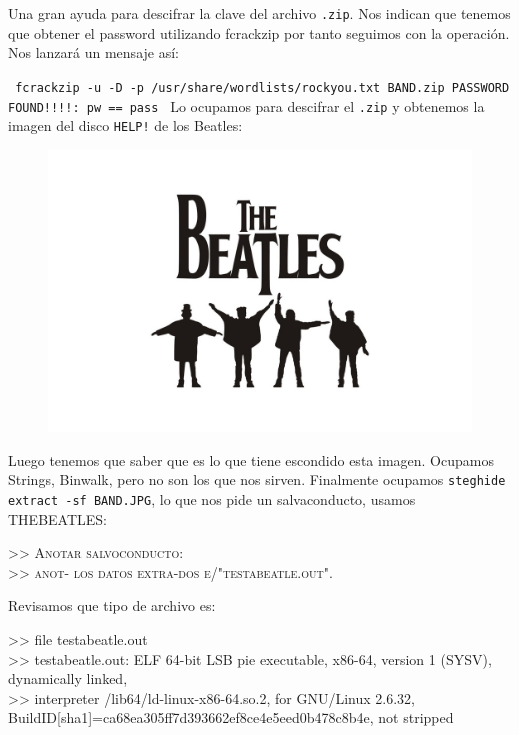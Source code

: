 \documentclass[letterpaper,10pt]{article}
\begin{document}
Una gran ayuda para descifrar la clave del archivo \texttt{.zip}. Nos indican que tenemos que obtener el password utilizando fcrackzip por tanto seguimos con la operación.
Nos lanzará un mensaje así:

\texttt{
fcrackzip -u -D -p /usr/share/wordlists/rockyou.txt BAND.zip
PASSWORD FOUND!!!!: pw == pass
}
\newpage
Lo ocupamos para descifrar el \texttt{.zip} y obtenemos la imagen del disco \texttt{HELP!} de los Beatles:

\begin{figure}[h]
  \centering
  \includegraphics[scale=0.2]{images/beatles/help}
  \label{fig:archivo}
\end{figure}

Luego tenemos que saber que es lo que tiene escondido esta imagen. Ocupamos Strings, Binwalk, pero no son los que nos sirven. Finalmente ocupamos \texttt{steghide extract -sf BAND.JPG}, lo que nos pide un salvaconducto, usamos THEBEATLES:

\textsc{
>> Anotar salvoconducto:\\
>> anot- los datos extra-dos e/"testabeatle.out".
}
\par

Revisamos que tipo de archivo es:

\textsf{
>> file testabeatle.out\\
>> testabeatle.out: ELF 64-bit LSB pie executable, x86-64, version 1 (SYSV), dynamically linked,\\
>> interpreter /lib64/ld-linux-x86-64.so.2, for GNU/Linux 2.6.32, BuildID[sha1]=ca68ea305ff7d393662ef8ce4e5eed0b478c8b4e, not stripped
}
\end{document}
